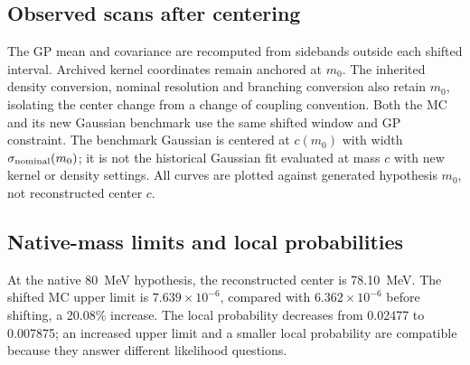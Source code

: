 \clearpage
\subsection{Observed scans after centering}
The GP mean and covariance are recomputed from sidebands outside each
shifted interval. Archived kernel coordinates remain anchored at $m_0$.
The inherited density conversion, nominal resolution and branching
conversion also retain $m_0$, isolating the center change from a change
of coupling convention. Both the MC and its new Gaussian benchmark use
the same shifted window and GP constraint. The benchmark Gaussian is
centered at $c(m_0)$ with width $\sigma_{\rm nominal}(m_0)$; it is not
the historical Gaussian fit evaluated at mass $c$ with new kernel or
density settings. All curves are plotted against generated hypothesis
$m_0$, not reconstructed center $c$.


\clearpage
\subsection{Native-mass limits and local probabilities}
\begin{table}[H]\centering\scriptsize

\caption{Original and shifted-window MC results. Limits use the inherited
coupling coordinate. The last column is the Gaussian benchmark centered
at the same MC core. All probabilities are local asymptotic references.}
\end{table}
\begin{table}[H]\centering\small

\caption{Matched centered-window comparison and retained MC probability
in the fitted bins. Support normalization remains unchanged; shifting
the mask does not renormalize its retained template fraction to one.}
\end{table}

At the native 80~MeV hypothesis, the reconstructed center is 78.10~MeV.
The shifted MC upper limit is $7.639\times10^{-6}$, compared with
$6.362\times10^{-6}$ before shifting, a 20.08\% increase. The local
probability decreases from 0.02477 to 0.007875; an increased upper limit
and a smaller local probability are compatible because they answer
different likelihood questions.

